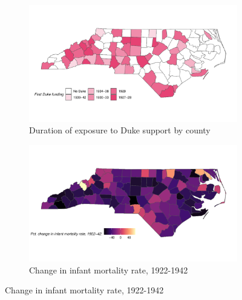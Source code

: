 \documentclass[12pt]{article}
\begin{document}
\begin{landscape}
\begin{figure}[!ht]
\begin{minipage}{.48\linewidth}
  \end{minipage}
  \begin{minipage}{.48\linewidth}

    \begin{subfigure}{\linewidth}
      \centering
      \includegraphics[width=0.72\linewidth]{../analysis/output/main/figure_1b_duke_map.pdf}
      \caption[Duration of exposure to Duke support by county]{Duration of exposure to Duke support by county}
      \label{fig:map-duke-duration}
  \end{subfigure}
    
    \begin{subfigure}{\linewidth}
        \centering
        \includegraphics[width=0.72\linewidth]{../analysis/output/main/figure_1d_imr_map.pdf}
        \caption[Change in infant mortality rate, 1922-1942]{Change in infant mortality rate, 1922-1942}
        \label{fig:map-change-imr}
    \end{subfigure}
  \end{minipage}


\end{figure}
\end{landscape}
\end{document}
